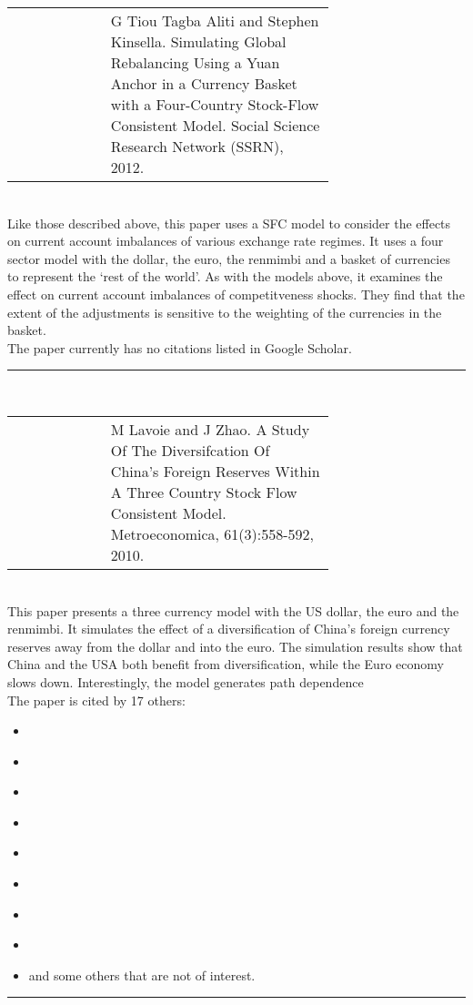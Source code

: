 \documentclass[twoside,a4paper,11pt]{article}
\begin{document}
\raggedright \begin{tabular}{lp{0.7\linewidth}}
\cite{Aliti2012a}  & G Tiou Tagba Aliti and Stephen Kinsella. Simulating Global Rebalancing Using a
Yuan Anchor in a Currency Basket with a Four-Country Stock-Flow Consistent Model.
Social Science Research Network (SSRN), 2012.
\end{tabular}\\[5pt]
Like those described above, this paper uses a SFC model to consider the effects on current account imbalances of various exchange rate regimes. It uses a four sector model with the dollar, the euro, the renmimbi and a basket of currencies to represent the `rest of the world'. As with the models above, it examines the effect on current account imbalances of competitveness shocks. They find that the extent of the adjustments is sensitive to the weighting of the currencies in the basket.\\[5pt]
The paper currently has no citations listed in Google Scholar.\\
\centering \rule{5cm}{1pt}  \\[1cm]

\raggedright \begin{tabular}{lp{0.7\linewidth}}
\cite{Lavoie2010a}  &  M Lavoie and J Zhao. A Study Of The Diversifcation Of China's Foreign Reserves
Within A Three Country Stock Flow Consistent Model. Metroeconomica, 61(3):558-592, 2010.
\end{tabular}\\[5pt]
This paper presents a three currency model with the US dollar, the euro and the renmimbi. It simulates the effect of a diversification of China's foreign currency reserves away from the dollar and into the euro. The simulation results show that China and the USA both benefit from diversification, while the Euro economy slows down. Interestingly, the model generates path dependence \\[5pt]
The paper is cited by 17 others:
\begin{itemize}
\item[] \cite{Caverzasi2013}
\item[] \cite{Caverzasi2014a}
\item[] \cite{Mazier2012b} 
\item[] \cite{Mazier2013a}
\item[] \cite{Mazier2015}
\item[] \cite{Kinsella2012a}
\item[] \cite{Valdecantos2015b}
\item[] \cite{Halporn2012}
\item[] and some others that are not of interest.
\end{itemize}
\centering \rule{5cm}{1pt}  \\[1cm]
\end{document}
